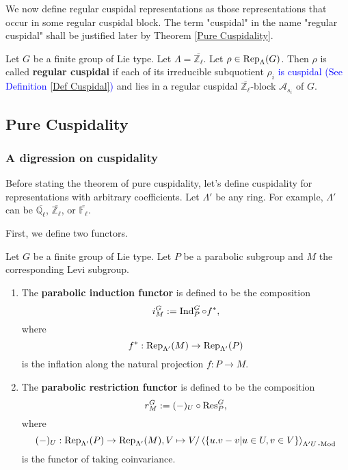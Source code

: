 	We now define regular cuspidal representations as those representations that occur in some regular cuspidal block. The term "cuspidal" in the name "regular cuspidal" shall be justified later by Theorem \ref{Pure Cuspidality}.
	
	\begin{definition}\label{Def regular cuspidal}
		Let $G$ be a finite group of Lie type. Let $\Lambda=\overline{\mathbb{Z}_{\ell}}$. Let $\rho \in \operatorname{\operatorname{Rep}}_{\Lambda}(G)$. Then $\rho$ is called \textbf{regular cuspidal} if each of its irreducible subquotient $\rho_i$ \textcolor{blue}{is cuspidal (See Definition \ref{Def Cuspidal})} and lies in a regular cuspidal $\overline{\mathbb{Z}_{\ell}}$-block $\mathcal{A}_{s_i}$ of $G$.
	\end{definition}
	
	
	
	
	\subsection{Pure Cuspidality}
	
	\subsubsection{A digression on cuspidality}
	
	Before stating the theorem of pure cuspidality, let's define cuspidality for representations with arbitrary coefficients. Let $\Lambda'$ be any ring. For example, $\Lambda'$ can be $\overline{\mathbb{Q}_{\ell}}$, $\overline{\mathbb{Z}_{\ell}}$, or $\overline{\mathbb{F}_{\ell}}$.
	
	First, we define two functors.
	
	\begin{definition} 
		Let $G$ be a finite group of Lie type. Let $P$ be a parabolic subgroup and $M$ the corresponding Levi subgroup.
		\begin{enumerate}
			\item The \textbf{parabolic induction functor} is defined to be the composition 
			$$i_M^G:= \operatorname{\operatorname{Ind}}_P^G \circ f^*,$$ where 
			$$f^*: \operatorname{\operatorname{Rep}}_{\Lambda'}(M) \to \operatorname{\operatorname{Rep}}_{\Lambda'}(P)$$
			is the inflation along the natural projection $f: P \to M$. 
			\item The \textbf{parabolic restriction functor} is defined to be the composition 
			$$r_M^G:= (-)_U \circ \operatorname{\operatorname{Res}}_P^G,$$ where 
			$$(-)_U: \operatorname{\operatorname{Rep}}_{\Lambda'}(P) \to \operatorname{\operatorname{Rep}}_{\Lambda'}(M), V \mapsto V/\left<\{u.v-v | u \in U, v \in V\}\right>_{\Lambda'U\operatorname{-Mod}}$$
			is the functor of taking coinvariance.
		\end{enumerate}
	\end{definition}
	
